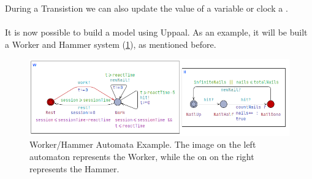 During a Transistion we can also update the value of a variable or clock a \cite{upp}.
\paragraph{}

It is now possible to build a model using Uppaal. As an example, it will be built a Worker and Hammer system (\ref{fig:worker model}), as mentioned before.

\begin{figure} [H]
    \centering
    \includegraphics[width=\linewidth]{chapters/worker_hammer.png}
    \caption{Worker/Hammer Automata Example. The image on the left automaton represents the Worker, while the on on the right represents the Hammer.}
    \label{fig:worker model}
\end{figure}




